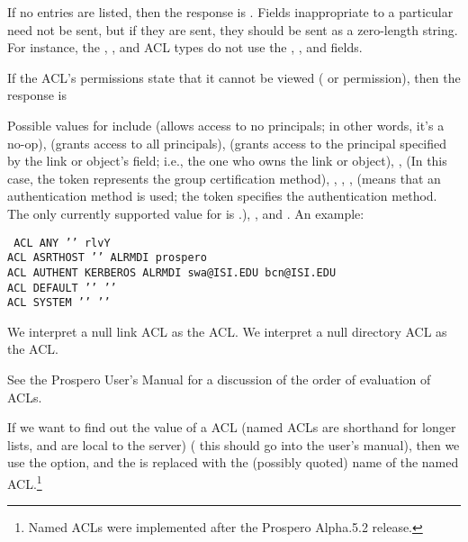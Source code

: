If no  entries are listed, then the response is .
Fields inappropriate to a particular  need not be
sent, but if they are sent, they should be sent as a zero-length
string.  For instance, the , , and
 ACL types do not use the ,
, and  fields.

If the ACL's permissions state that it cannot be viewed ( or
 permission), then the
response is  
\begin{command}
    \zoos{}\zooe
\end{command}

Possible values for  include  (allows
access to no principals; in other words, it's a no-op), 
(grants access to all 
principals),  (grants access to the principal specified by
the link or object's  field; i.e., the one who owns the
link or object),  
, %
 (In this case, the  token
represents the group certification method),
, , ,  (means
that an 
authentication method is used; the  token
specifies the 
authentication method.  The only currently supported value for
 is .),  , and
.  An example:  
\begin{command}
\tt
ACL ANY '{}' rlvY \\
ACL ASRTHOST '{}' ALRMDI prospero \\
ACL AUTHENT KERBEROS ALRMDI swa@ISI.EDU bcn@ISI.EDU \\
ACL DEFAULT '{}' '{}' \\
ACL SYSTEM '{}' '{}' \\
\end{command}

We interpret a null link ACL as the  ACL.  
We interpret a null directory ACL as the  ACL.

See the Prospero User's Manual for a discussion of the order of
evaluation of ACLs.

If we want to find out the value of a  ACL (named ACLs are
shorthand for longer lists, and are local to the server) ( this
should go into the user's manual), then we use
the  option, and the 
 is replaced with the (possibly quoted) name
of the named ACL.\footnote{Named ACLs were implemented after the Prospero
Alpha.5.2 release.}

